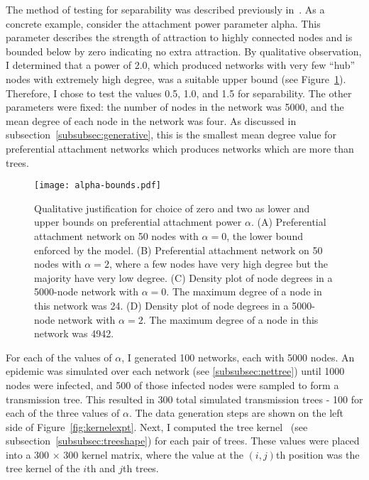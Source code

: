 The method of testing for separability was described previously
in~\autocite{poon2015phylodynamic}. As a concrete example, consider the
attachment power parameter \gls{alpha}. This parameter describes the strength
of attraction to highly connected nodes and is bounded below by zero indicating
no extra attraction. By qualitative observation, I determined that a power of
2.0, which produced networks with very few ``hub'' nodes with extremely high
degree, was a suitable upper bound (see Figure~\ref{fig:alphabds}). Therefore,
I chose to test the values 0.5, 1.0, and 1.5 for separability. The other
parameters were fixed: the number of nodes in the network was 5000, and the
mean degree of each node in the network was four. As discussed in
subsection~\ref{subsubsec:generative}, this is the smallest mean degree value
for preferential attachment networks which produces networks which are more
than trees. 

\begin{figure}[ht]
  \centering
  \label{fig:alphabds}
  \texttt{[image: alpha-bounds.pdf]}
  \caption[Upper and lower bounds on preferential attachment power]{
    Qualitative justification for choice of zero and two as lower and upper
    bounds on preferential attachment power $\alpha$. (A) Preferential
    attachment network on 50 nodes with $\alpha = 0$, the lower bound enforced
    by the model. (B) Preferential attachment network on 50 nodes with $\alpha
    = 2$, where a few nodes have very high degree but the majority have very
    low degree. (C) Density plot of node degrees in a 5000-node network with
    $\alpha = 0$. The maximum degree of a node in this network was 24. (D)
    Density plot of node degrees in a 5000-node network with $\alpha = 2$. The
    maximum degree of a node in this network was 4942. 
  }
\end{figure}

For each of the values of $\alpha$, I generated 100 networks, each with 5000
nodes. An epidemic was simulated over each network (see
\cref{subsubsec:nettree}) until 1000 nodes were infected, and 500 of those
infected nodes were sampled to form a transmission tree. This resulted in 300
total simulated transmission trees - 100 for each of the three values of
$\alpha$. The data generation steps are shown on the left side of
Figure~\ref{fig:kernelexpt}. Next, I computed the tree
kernel~\autocite{poon2013mapping} (see subsection~\ref{subsubsec:treeshape})
for each pair of trees. These values were placed into a 300 $\times$ 300 kernel
matrix, where the value at the $(i, j)$th position was the tree kernel of the
$i$th and $j$th trees. 

